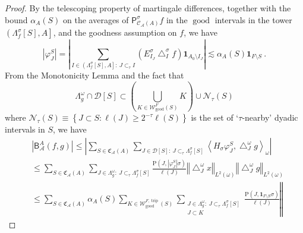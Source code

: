 \documentclass{amsart}%
\theoremstyle{plain}
\numberwithin{equation}{section}
\begin{document}
\begin{proof}
By the telescoping property of martingale differences, together with the bound
$\alpha_{A}\left(  S\right)  $ on the averages of $\mathsf{P}_{\mathcal{C}%
_{\mathcal{A}}\left(  A\right)  }^{\sigma}f$ in the $\operatorname{good}$
intervals in the tower $\left(  \Lambda_{f}^{\sigma}\left[  S\right]
,A\right]  $, and the goodness assumption on $f$, we have%
\begin{equation}
\left\vert \varphi_{J}^{S}\right\vert =\left\vert \sum_{I\in\left(
\Lambda_{f}^{\sigma}\left[  S\right]  ,A\right]  :\ J\subset_{\tau}I}\left(
E_{I_{J}}^{\sigma}\bigtriangleup_{I}^{\sigma}f\right)  \mathbf{1}%
_{A_{0}\setminus I_{J}}\right\vert \lesssim\alpha_{A}\left(  S\right)
\mathbf{1}_{F\setminus S}\ .\label{bfi 3}%
\end{equation}
From the Monotonicity Lemma and the fact that%
\[
\Lambda_{g}^{\omega}\cap\mathcal{D}\left[  S\right]  \subset\left(
\bigcup_{K\in\mathcal{W}_{\operatorname{good}}^{F}\left(  S\right)  }K\right)
\cup\mathcal{N}_{\tau}\left(  S\right)
\]
where $\mathcal{N}_{\tau}\left(  S\right)  \equiv\left\{  J\subset
S:\ell\left(  J\right)  \geq2^{-\tau}\ell\left(  S\right)  \right\}  $ is the
set of `$\tau$-nearby' dyadic intervals in $S$, we have%
\begin{align*}
& \left\vert \mathsf{B}_{\mathcal{A}}^{A}\left(  f,g\right)  \right\vert
\leq\left\vert \sum_{S\in\mathfrak{C}_{\mathcal{A}}\left(  A\right)  }%
\sum_{J\in\mathcal{D}\left[  S\right]  :\ J\subset_{\tau}\Lambda_{f}^{\sigma
}\left[  S\right]  }\left\langle H_{\sigma}\varphi_{J}^{S},\bigtriangleup
_{J}^{\omega}g\right\rangle _{\omega}\right\vert \\
& \leq\sum_{S\in\mathfrak{C}_{\mathcal{A}}\left(  A\right)  }\sum_{J\in
\Lambda_{g}^{\omega}:\ J\subset_{\tau}\Lambda_{f}^{\sigma}\left[  S\right]
}\frac{\mathrm{P}\left(  J,\left\vert \varphi_{J}^{S}\right\vert
\sigma\right)  }{\ell\left(  J\right)  }\left\Vert \bigtriangleup_{J}^{\omega
}x\right\Vert _{L^{2}\left(  \omega\right)  }\left\Vert \bigtriangleup
_{J}^{\omega}g\right\Vert _{L^{2}\left(  \omega\right)  }\\
& \leq\sum_{S\in\mathfrak{C}_{\mathcal{A}}\left(  A\right)  }\alpha_{A}\left(
S\right)  \sum_{K\in\mathcal{W}_{\operatorname{good}}^{F,\operatorname*{trip}%
}\left(  S\right)  }\sum_{\substack{J\in\Lambda_{g}^{\omega}:\ J\subset_{\tau
}\Lambda_{f}^{\sigma}\left[  S\right]  \\J\subset K}}\frac{\mathrm{P}\left(
J,\mathbf{1}_{F\setminus S}\sigma\right)  }{\ell\left(  J\right)  }\left\Vert

\end{align*}
\end{proof}
\end{document}
